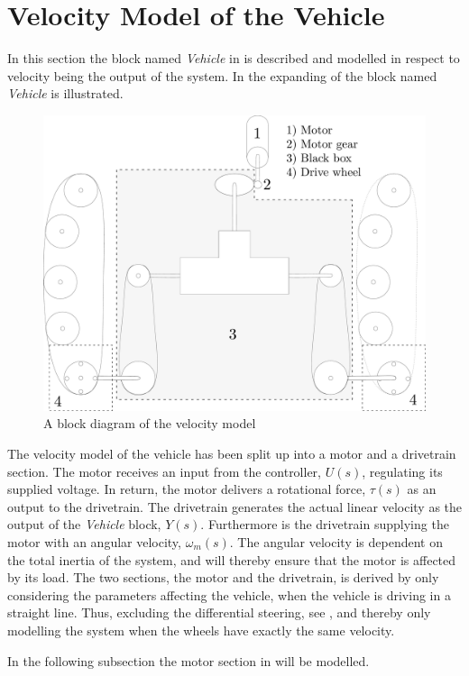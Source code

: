 \section{Velocity Model of the Vehicle}
In this section the block named \textit{Vehicle} in   is described and modelled in respect to velocity being the output of the system. In  the expanding of the block named \textit{Vehicle} is illustrated.

\begin{figure}[H]
	\centering
	\includegraphics[scale=0.2]{figures/vehicleDescriptionDriveTrainBlackBox.pdf}
	\caption{A block diagram of the velocity model}
	\label{fig:vehicleDescriptionDriveTrainBlackBox}
\end{figure}


The velocity model of the vehicle has been split up into a motor and a drivetrain section. The motor receives an input from the controller, $U(s)$, regulating its supplied voltage. In return, the motor delivers a rotational force, $\tau(s)$ as an output to the drivetrain. The drivetrain generates the actual linear velocity as the output of the \textit{Vehicle} block, $Y(s)$. Furthermore is the drivetrain supplying the motor with an angular velocity, $\omega_m(s)$. The angular velocity  is dependent on the total inertia of the system, and will thereby ensure that the motor is affected by its load. The two sections, the motor and the drivetrain, is derived by only considering the parameters affecting the vehicle, when the vehicle is driving in a straight line. Thus, excluding the differential steering, see , and thereby only modelling the system when the wheels have exactly the same velocity.

In the following subsection the motor section in  will be modelled.